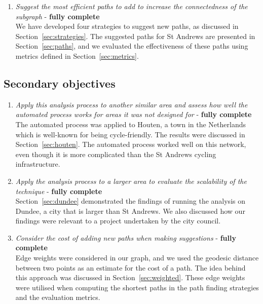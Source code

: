 \documentclass[12pt,a4paper]{report}
\begin{document}
\begin{enumerate}
    \item \textit{Suggest the most efficient paths to add to increase the connectedness of the subgraph} - \textbf{fully complete}\\[1mm]
    We have developed four strategies to suggest new paths, as discussed in Section~\ref{sec:strategies}. The suggested paths for St Andrews are presented in Section~\ref{sec:paths}, and we evaluated the effectiveness of these paths using metrics defined in Section~\ref{sec:metrics}.
\end{enumerate}

\subsection{Secondary objectives}
\begin{enumerate}
    \item \textit{Apply this analysis process to another similar area and assess how well the automated process works for areas it was not designed for} - \textbf{fully complete}\\[1mm]
    The automated process was applied to Houten, a town in the Netherlands which is well-known for being cycle-friendly. The results were discussed in Section~\ref{sec:houten}. The automated process worked well on this network, even though it is more complicated than the St Andrews cycling infrastructure.

    \item \textit{Apply the analysis process to a larger area to evaluate the scalability of the technique} - \textbf{fully complete}\\[1mm]
    Section~\ref{sec:dundee} demonstrated the findings of running the analysis on Dundee, a city that is larger than St Andrews. We also discussed how our findings were relevant to a project undertaken by the city council.

    \item \textit{Consider the cost of adding new paths when making suggestions} - \textbf{fully complete}\\[1mm]
    Edge weights were considered in our graph, and we used the geodesic distance between two points as an estimate for the cost of a path. The idea behind this approach was discussed in Section~\ref{sec:weighted}. These edge weights were utilised when computing the shortest paths in the path finding strategies and the evaluation metrics.
\end{enumerate}
\end{document}
